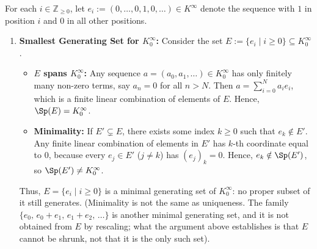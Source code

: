 \begin{exercisesolution}
\label{sol:generating_sets_sequences}
For each $i \in \mathbb{Z}_{\ge 0}$, let $e_i := (0, \dots, 0, 1, 0, \dots) \in K^\infty$ denote the sequence with $1$ in position $i$ and $0$ in all other positions.

\begin{enumerate}[label=\textbf{(\alph*)}]
    \item \textbf{Smallest Generating Set for $K_0^\infty$:}
    Consider the set $E := \{e_i \mid i \ge 0\} \subseteq K_0^\infty$.
    \begin{itemize}
        \item \textbf{$E$ spans $K_0^\infty$:} Any sequence $a = (a_0, a_1, \dots) \in K_0^\infty$ has only finitely many non-zero terms, say $a_n = 0$ for all $n > N$. Then $a = \sum_{i=0}^N a_i e_i$, which is a finite linear combination of elements of $E$. Hence, $\Sp(E) = K_0^\infty$.
        \item \textbf{Minimality:} If $E' \subsetneq E$, there exists some index $k \ge 0$ such that $e_k \notin E'$. Any finite linear combination of elements in $E'$ has $k$-th coordinate equal to $0$, because every $e_j \in E'$ ($j \ne k$) has $(e_j)_k = 0$. Hence, $e_k \notin \Sp(E')$, so $\Sp(E') \ne K_0^\infty$.
    \end{itemize}
    Thus, $E = \{e_i \mid i \ge 0\}$ is a minimal generating set of $K_0^\infty$: no proper subset of it still generates. (Minimality is not the same as uniqueness. The family $\{e_0,\, e_0 + e_1,\, e_1 + e_2,\, \dots\}$ is another minimal generating set, and it is not obtained from $E$ by rescaling; what the argument above establishes is that $E$ cannot be shrunk, not that it is the only such set).


\end{enumerate}
\end{exercisesolution}
